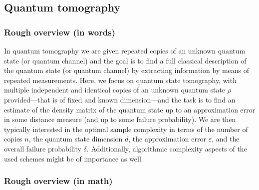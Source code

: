 
\begin{refsection}

\section{Quantum tomography}\label{prim:Tomography}

\subsubsection*{Rough overview (in words)}

In quantum tomography we are given repeated copies of an unknown quantum state (or quantum channel) and the goal is to find a full classical description of the quantum state (or quantum channel) by extracting information by means of repeated measurements. Here, we focus on quantum state tomography, with multiple independent and identical copies of an unknown quantum state $\rho$ provided---that is of fixed and known dimension---and the task is to find an estimate of the density matrix of the quantum state up to an approximation error in some distance measure (and up to some failure probability). We are then typically interested in the optimal sample complexity in terms of the number of copies $n$, the quantum state dimension $d$, the approximation error $\varepsilon$, and the overall failure probability $\delta$. Additionally, algorithmic complexity aspects of the used schemes might be of importance as well.


\subsubsection*{Rough overview (in math)}


\end{refsection}
